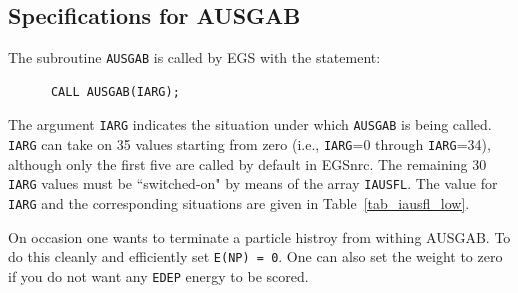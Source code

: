 \subsection{Specifications for AUSGAB}
\label{ausgab}

The subroutine {\tt AUSGAB} is called by EGS with the statement:
\begin{verbatim}
      CALL AUSGAB(IARG);
\end{verbatim}
The argument {\tt IARG} indicates the situation under which {\tt AUSGAB}
is being called.  {\tt IARG} can take on 35 values starting from zero
(i.e., {\tt IARG}=0 through {\tt IARG}=34), although only the first
five are called by default in EGSnrc.  The remaining 30 {\tt IARG}
values must be ``switched-on" by means of the array {\tt IAUSFL}.
The value for {\tt IARG} and the corresponding situations are given in
Table~\ref{tab_iausfl_low}.

On occasion one wants to terminate a particle histroy from withing AUSGAB.
To do this cleanly and efficiently set {\tt E(NP) = 0}. One can also set
the weight to zero if you do not want any {\tt EDEP} energy to be scored.

